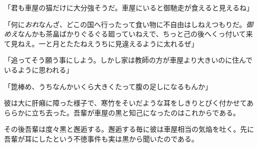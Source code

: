 \documentclass[12pt, openright]{book}
\begin{document}
「君も車屋の猫だけに大分強そうだ。車屋にいると御馳走が食えると見えるね」

「何に\emph{おれ}なんざ、どこの国へ行ったって食い物に不自由はしねえつもりだ。\emph{御めえ}なんかも茶畠ばかりぐるぐる廻っていねえで、ちっと己の後へくっ付いて来て見ねえ。一と月とたたねえうちに見違えるように太れるぜ」

「追ってそう願う事にしよう。しかし家は教師の方が車屋より大きいのに住んでいるように思われる」

「箆棒め、うちなんかいくら大きくたって腹の足しになるもんか」

彼は大に肝癪に障った様子で、寒竹をそいだような耳をしきりとぴく付かせてあららかに立ち去った。吾輩が車屋の黒と知己になったのはこれからである。

その後吾輩は度々黒と邂逅する。邂逅する毎に彼は車屋相当の気焔を吐く。先に吾輩が耳にしたという不徳事件も実は黒から聞いたのである。
\end{document}
